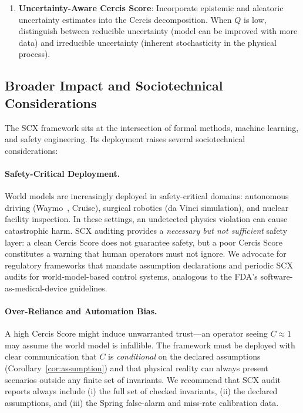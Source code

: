 \documentclass[11pt,twocolumn]{article}
\theoremstyle{definition}
\begin{document}
\begin{enumerate}[leftmargin=*,nosep]
    rigid-body mechanics to include fluid dynamics (Navier--Stokes
    conservation), electromagnetic constraints (Maxwell's equations in
    differentiable form), and thermodynamic laws (entropy production
    monitors).  Each domain introduces new invariant structures and
    module-specific certificates.
  \item \textbf{Uncertainty-Aware Cercis Score}: Incorporate epistemic and
    aleatoric uncertainty estimates into the Cercis decomposition.  When
    $Q$ is low, distinguish between reducible uncertainty (model can be
    improved with more data) and irreducible uncertainty (inherent stochasticity
    in the physical process).
\end{enumerate}

\subsection{Broader Impact and Sociotechnical Considerations}

The SCX framework sits at the intersection of formal methods, machine
learning, and safety engineering.  Its deployment raises several
sociotechnical considerations:

\paragraph{Safety-Critical Deployment.}
World models are increasingly deployed in safety-critical domains: autonomous
driving (Waymo~\cite{waymo2023}, Cruise), surgical robotics (da Vinci
simulation), and nuclear facility inspection.  In these settings, an
undetected physics violation can cause catastrophic harm.  SCX auditing
provides a \emph{necessary but not sufficient} safety layer: a clean Cercis
Score does not guarantee safety, but a poor Cercis Score constitutes a
warning that human operators must not ignore.  We advocate for regulatory
frameworks that mandate assumption declarations and periodic SCX audits for
world-model-based control systems, analogous to the FDA's software-as-medical-device
guidelines.

\paragraph{Over-Reliance and Automation Bias.}
A high Cercis Score might induce unwarranted trust---an operator seeing
$C \approx 1$ may assume the world model is infallible.  The framework must
be deployed with clear communication that $C$ is \emph{conditional} on the
declared assumptions (Corollary~\ref{cor:assumption}) and that physical
reality can always present scenarios outside any finite set of invariants.
We recommend that SCX audit reports always include (i) the full set of
checked invariants, (ii) the declared assumptions, and (iii) the Spring
false-alarm and miss-rate calibration data.
\end{document}
